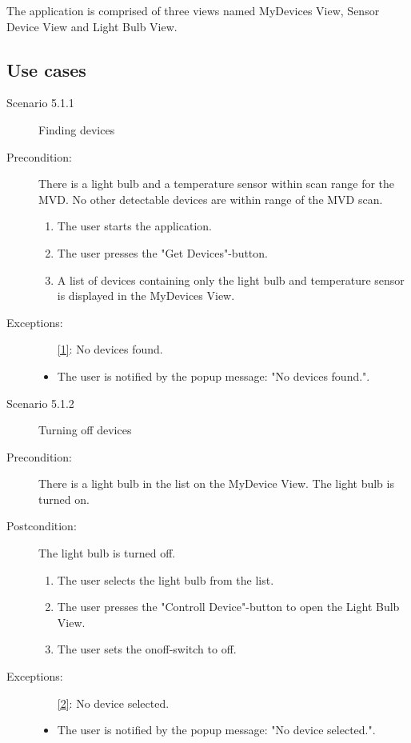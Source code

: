 \documentclass[a4paper]{article}
\begin{document}
The application is comprised of three views named MyDevices View, Sensor Device View and Light Bulb View. 

\subsection{Use cases}
\begin{description}
\item[Scenario 5.1.1] Finding devices
\item[Precondition:] There is a light bulb and a temperature sensor within scan range for the MVD. No other detectable devices are within range of the MVD scan.
\begin{enumerate}
\item The user starts the application.
\item The user presses the "Get Devices"-button.
\item \label{1} A list of devices containing only the light bulb and temperature sensor is displayed in the MyDevices View.
\end{enumerate}

\item[Exceptions:]
\begin{itemize}
\item [\ref{1}:] No devices found.
\item The user is notified by the popup message: "No devices found.".
\end{itemize}

\item[]

\item[Scenario 5.1.2] Turning off devices
\item[Precondition:] There is a light bulb in the list on the MyDevice View. The light bulb is turned on.
\item[Postcondition:] The light bulb is turned off.
\begin{enumerate}
\item The user selects the light bulb from the list.
\item \label{2} The user presses the "Controll Device"-button to open the Light Bulb View.
\item  The user sets the onoff-switch to off.
\end{enumerate}

\item[Exceptions:]

\begin{itemize}
\item [\ref{2}:] No device selected.
\item The user is notified by the popup message: "No device selected.".
\end{itemize}


\end{description}
\end{document}
